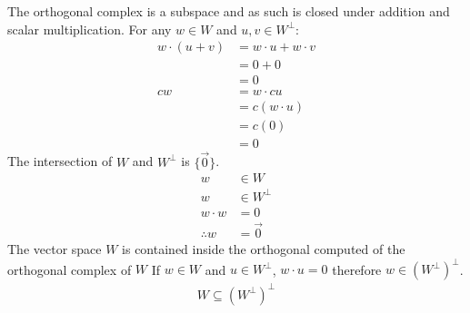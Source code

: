 \documentclass{article}
\theoremstyle{mytheoremstyle}
\theoremstyle{mytheoremstyle}
\theoremstyle{myproblemstyle}
\begin{document}
    The orthogonal complex is a subspace and as such is closed under addition
    and scalar multiplication. For any $w\in W$ and $u,v\in W^\perp$:
    \begin{align*}
        w \cdot (u+v) &= w\cdot u + w\cdot v \\
        &= 0 + 0 \\
        &= 0 \\
        cw &= w\cdot cu \\
        &= c(w\cdot u) \\
        &= c(0) \\
        &= 0
    \end{align*}
    The intersection of $W$ and $W^\perp$ is $\{\vec{0}\}$.
    \begin{align*}
        w &\in W \\
        w &\in W^\perp \\
        w \cdot w &= 0 \\
        \therefore w &= \vec{0}
    \end{align*}
    The vector space $W$ is contained inside the orthogonal computed of the
    orthogonal complex of $W$ If $w\in W$ and $u\in W^\perp$, $w\cdot u = 0$
    therefore $w\in (W^\perp)^\perp$.
    \begin{align*}
        W \subseteq (W^\perp)^\perp
    \end{align*}
\end{document}
